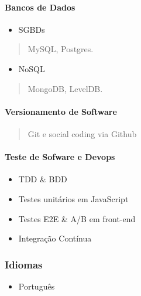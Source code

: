 \documentclass[]{article}
\providecommand{\tightlist}{%
  \setlength{\itemsep}{0pt}\setlength{\parskip}{0pt}}
\let\oldparagraph\paragraph
\renewcommand{\paragraph}[1]{\oldparagraph{#1}\mbox{}}
\begin{document}
\paragraph{Bancos de Dados}\label{bancos-de-dados}

\begin{itemize}
\tightlist
\item
  SGBDs
\end{itemize}

\begin{quote}
MySQL, Postgres.
\end{quote}

\begin{itemize}
\tightlist
\item
  NoSQL
\end{itemize}

\begin{quote}
MongoDB, LevelDB.
\end{quote}

\paragraph{Versionamento de Software}\label{versionamento-de-software}

\begin{quote}
Git e social coding via Github
\end{quote}

\paragraph{Teste de Sofware e Devops}\label{teste-de-sofware-e-devops}

\begin{itemize}
\item
  TDD \& BDD
\item
  Testes unitários em JavaScript
\item
  Testes E2E \& A/B em front-end
\item
  Integração Contínua
\end{itemize}

\subsubsection{Idiomas}\label{idiomas}

\begin{itemize}
\tightlist
\item
  Português
\end{itemize}
\end{document}
